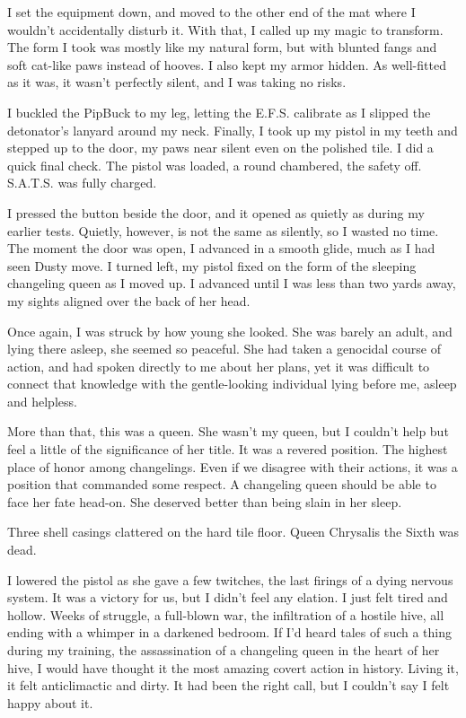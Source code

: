 I set the equipment down, and moved to the other end of the mat where I wouldn’t accidentally disturb it. With that, I called up my magic to transform. The form I took was mostly like my natural form, but with blunted fangs and soft cat-like paws instead of hooves. I also kept my armor hidden. As well-fitted as it was, it wasn’t perfectly silent, and I was taking no risks.

I buckled the PipBuck to my leg, letting the E.F.S. calibrate as I slipped the detonator’s lanyard around my neck. Finally, I took up my pistol in my teeth and stepped up to the door, my paws near silent even on the polished tile. I did a quick final check. The pistol was loaded, a round chambered, the safety off. S.A.T.S. was fully charged.

I pressed the button beside the door, and it opened as quietly as during my earlier tests. Quietly, however, is not the same as silently, so I wasted no time. The moment the door was open, I advanced in a smooth glide, much as I had seen Dusty move. I turned left, my pistol fixed on the form of the sleeping changeling queen as I moved up. I advanced until I was less than two yards away, my sights aligned over the back of her head.

Once again, I was struck by how young she looked. She was barely an adult, and lying there asleep, she seemed so peaceful. She had taken a genocidal course of action, and had spoken directly to me about her plans, yet it was difficult to connect that knowledge with the gentle-looking individual lying before me, asleep and helpless.

More than that, this was a queen. She wasn’t my queen, but I couldn’t help but feel a little of the significance of her title. It was a revered position. The highest place of honor among changelings. Even if we disagree with their actions, it was a position that commanded some respect. A changeling queen should be able to face her fate head-on. She deserved better than being slain in her sleep.

Three shell casings clattered on the hard tile floor. Queen Chrysalis the Sixth was dead.

I lowered the pistol as she gave a few twitches, the last firings of a dying nervous system. It was a victory for us, but I didn’t feel any elation. I just felt tired and hollow. Weeks of struggle, a full-blown war, the infiltration of a hostile hive, all ending with a whimper in a darkened bedroom. If I’d heard tales of such a thing during my training, the assassination of a changeling queen in the heart of her hive, I would have thought it the most amazing covert action in history. Living it, it felt anticlimactic and dirty. It had been the right call, but I couldn’t say I felt happy about it.

